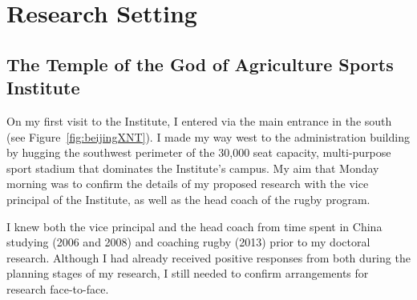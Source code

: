 
\begin{savequote}[8cm]

  \qauthor{}
\end{savequote}


\chapter{\label{chap:researchSetting}Research Setting}


\minitoc




                                  \begin{CJK}{UTF8}{gbsn}


\section{The Temple of the God of Agriculture Sports Institute}
On my first visit to the Institute, I entered via the main entrance in the south (see Figure~\ref{fig:beijingXNT}).  I made my way west to the administration building by hugging the southwest perimeter of the 30,000 seat capacity, multi-purpose sport stadium that dominates the Institute's campus. My aim that Monday morning was to confirm the details of my proposed research with the vice principal of the Institute, as well as the head coach of the rugby program.

I knew both the vice principal and the head coach from time spent in China studying (2006 and 2008) and coaching rugby (2013) prior to my doctoral research.  Although I had already received positive responses from both during the planning stages of my research, I still needed to confirm arrangements for research face-to-face.




\end{CJK}
